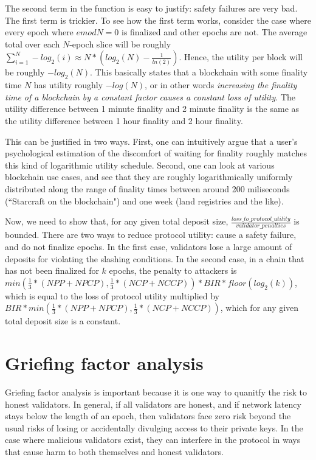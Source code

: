 \documentclass[12pt]{article}
\begin{document}
The second term in the function is easy to justify: safety failures are very bad. The first term is trickier. To see how the first term works, consider the case where every epoch where $e mod N = 0$ is finalized and other epochs are not. The average total over each $N$-epoch slice will be roughly $\sum_{i=1}^N -log_2(i) \approx N * (log_2(N) - \frac{1}{ln(2)})$. Hence, the utility per block will be roughly $-log_2(N)$. This basically states that a blockchain with some finality time $N$ has utility roughly $-log(N)$, or in other words \textit{increasing the finality time of a blockchain by a constant factor causes a constant loss of utility}. The utility difference between 1 minute finality and 2 minute finality is the same as the utility difference between 1 hour finality and 2 hour finality.

This can be justified in two ways. First, one can intuitively argue that a user's psychological estimation of the discomfort of waiting for finality roughly matches this kind of logarithmic utility schedule. Second, one can look at various blockchain use cases, and see that they are roughly logarithmically uniformly distributed along the range of finality times between around 200 miliseconds (``Starcraft on the blockchain") and one week (land registries and the like).

Now, we need to show that, for any given total deposit size, $\frac{loss\_to\_protocol\_utility}{validator\_penalties}$ is bounded. There are two ways to reduce protocol utility: cause a safety failure, and do not finalize epochs. In the first case, validators lose a large amount of deposits for violating the slashing conditions. In the second case, in a chain that has not been finalized for $k$ epochs, the penalty to attackers is $min(\frac{1}{3} * (NPP + NPCP), \frac{1}{3} * (NCP + NCCP)) * BIR * floor(log_2(k))$, which is equal to the loss of protocol utility multiplied by $BIR * min(\frac{1}{3} * (NPP + NPCP), \frac{1}{3} * (NCP + NCCP))$, which for any given total deposit size is a constant.

\section{Griefing factor analysis}

Griefing factor analysis is important because it is one way to quanitfy the risk to honest validators. In general, if all validators are honest, and if network latency stays below the length of an epoch, then validators face zero risk beyond the usual risks of losing or accidentally divulging access to their private keys. In the case where malicious validators exist, they can interfere in the protocol in ways that cause harm to both themselves and honest validators.
\end{document}
